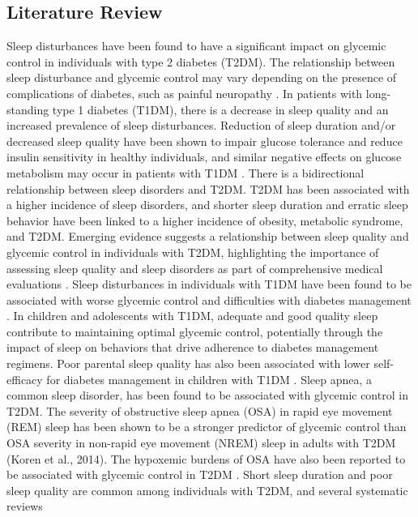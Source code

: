 \subsection*{Literature Review}
Sleep disturbances have been found to have a significant impact on glycemic
control in individuals with type 2 diabetes (T2DM). The relationship between
sleep disturbance and glycemic control may vary depending on the presence of
complications of diabetes, such as painful neuropathy \parencite{zhu-2017}. In
patients with long-standing type 1 diabetes (T1DM), there is a decrease in sleep
quality and an increased prevalence of sleep disturbances. Reduction of sleep
duration and/or decreased sleep quality have been shown to impair glucose
tolerance and reduce insulin sensitivity in healthy individuals, and similar
negative effects on glucose metabolism may occur in patients with T1DM
\parencite{van-dijk-2011}.  There is a bidirectional relationship between sleep
disorders and T2DM. T2DM has been associated with a higher incidence of sleep
disorders, and shorter sleep duration and erratic sleep behavior have been
linked to a higher incidence of obesity, metabolic syndrome, and T2DM. Emerging
evidence suggests a relationship between sleep quality and glycemic control in
individuals with T2DM, highlighting the importance of assessing sleep quality
and sleep disorders as part of comprehensive medical evaluations
\parencite{khandelwal-2017}.  Sleep disturbances in individuals with T1DM have
been found to be associated with worse glycemic control and difficulties with
diabetes management \parencite{perfect-2020}. In children and adolescents with
T1DM, adequate and good quality sleep contribute to maintaining optimal glycemic
control, potentially through the impact of sleep on behaviors that drive
adherence to diabetes management regimens. Poor parental sleep quality has also
been associated with lower self-efficacy for diabetes management in children
with T1DM \parencite{perez-2018}.  Sleep apnea, a common sleep disorder, has
been found to be associated with glycemic control in T2DM. The severity of
obstructive sleep apnea (OSA) in rapid eye movement (REM) sleep has been shown
to be a stronger predictor of glycemic control than OSA severity in non-rapid
eye movement (NREM) sleep in adults with T2DM (Koren et al., 2014). The
hypoxemic burdens of OSA have also been reported to be associated with glycemic
control in T2DM \parencite{koren-2014}.  Short sleep duration and poor sleep
quality are common among individuals with T2DM, and several systematic reviews

